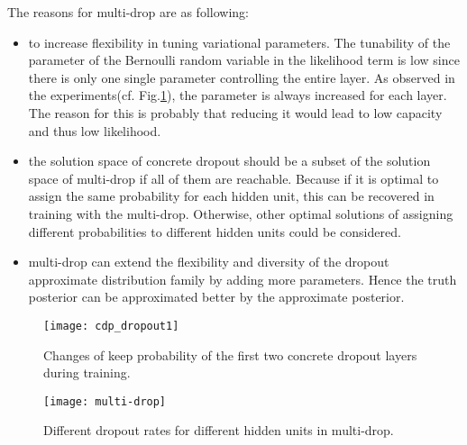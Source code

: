 The reasons for multi-drop are as following:
\begin{itemize}
	\item to increase flexibility in tuning variational parameters. The tunability of the parameter of the Bernoulli random variable in the likelihood term is low since there is only one single parameter controlling the entire layer. As observed in the experiments(cf. Fig.\ref{fig:cdp_dropout1}), the parameter is always increased for each layer.
	The reason for this is probably that reducing it would lead to low capacity and thus low likelihood. 
	
	\item the solution space of concrete dropout should be a subset of the solution space of multi-drop if all of them are reachable. Because if it is optimal to assign the same probability for each hidden unit, this can be recovered in training with the multi-drop. Otherwise, other optimal solutions of assigning different probabilities to different hidden units could be considered.
	
	\item multi-drop can extend the flexibility and diversity of the dropout approximate distribution family by adding more parameters. Hence the truth posterior can be approximated better by the approximate posterior.
	
\end{itemize}

\begin{figure}[H]
	\begin{center}
		\texttt{[image: cdp\_dropout1]}	
		\caption{Changes of keep probability of the first two concrete dropout layers during training.}
		\label{fig:cdp_dropout1}
	\end{center}
\end{figure}

\begin{figure}[H]
	\begin{center}
		\centering
		\texttt{[image: multi-drop]}
		\caption{Different dropout rates for different hidden units in multi-drop.}		
		\label{fig:multi-drop}
	\end{center}
\end{figure}


